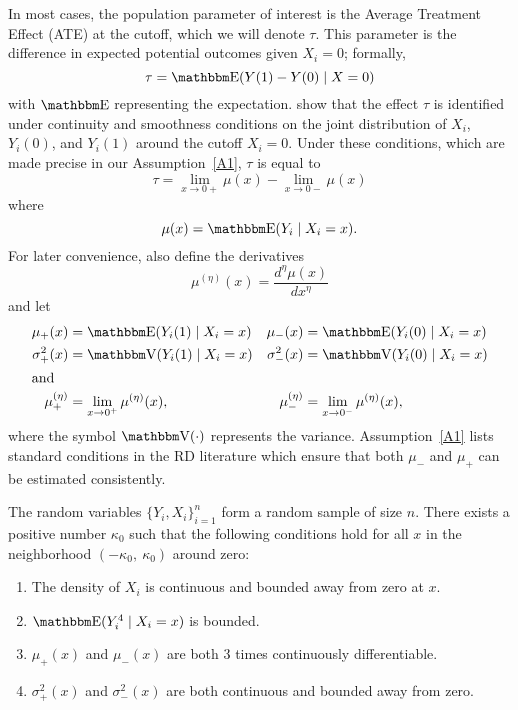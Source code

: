 \documentclass[12pt,fleqn]{article}
\begin{document}
In most cases, the population parameter of interest is the Average Treatment
Effect (ATE) at the cutoff, which we will denote $\tau$. This parameter is the
difference in expected potential outcomes given $X_i = 0$; formally,
\begin{equation*}
  \tau=\E(Y(1)-Y(0) \mid X=0)
\end{equation*}
with $\E$ representing the expectation.
\cite{HTV2001} show that the effect $\tau$ is identified under continuity and
smoothness conditions on the joint distribution of $X_i$, $Y_i(0)$, and $Y_i(1)$
around the cutoff $X_i = 0$. Under these conditions, which are made precise
in our Assumption~\ref{A1}, $\tau$ is equal to
\begin{equation*}
  \tau = \lim_{x \to 0+} \mu(x) - \lim_{x \to 0-} \mu(x)
\end{equation*}
where
\begin{equation*}
  \mu(x)= \E(Y_{i} \mid X_{i}=x).
\end{equation*}
For later convenience, also define the derivatives
\begin{equation*}
  \mu^{(\eta)}(x)=\frac{d^{\eta}\mu(x)}{dx^{\eta}}
\end{equation*}
and let
\begin{align*}
  \mu_{+}(x)
  &= \E( Y_{i}(1) \mid X_{i}=x )
  &\mu_{-}(x)
  &= \E( Y_{i}(0) \mid X_{i}=x ) \\
  \sigma^{2}_{+}(x) &= \V( Y_{i}(1) \mid X_{i}=x )
  &\sigma^{2}_{-}(x)&=\V( Y_{i}(0) \mid X_{i}=x ) \\
\intertext{and}
  \mu^{(\eta)}_{+}
  &= \lim_{x \rightarrow 0^{+}}\mu^{(\eta)}(x),
  &\mu^{(\eta)}_{-}
  &= \lim_{x \rightarrow 0^{-}}\mu^{(\eta)}(x),
\end{align*}
where the symbol $\V(\cdot)$ represents the variance. Assumption~\ref{A1} lists
standard conditions in the RD literature which ensure that both $\mu_-$ and
$\mu_+$ can be estimated consistently.

\begin{assumption}\label{A1}
  The random variables $\{Y_i, X_i\}_{i=1}^n$ form a random sample of size $n$.
  There exists a positive number $\kappa_0$ such that the following
  conditions hold for all $x$ in the neighborhood $(-\kappa_{0},\ \kappa_{0})$
  around zero:
  \begin{enumerate}
  \item The density of $X_i$ is continuous and bounded away from zero at $x$.
  \item $\E(Y_{i}^{4} \mid X_{i}=x)$ is bounded.
  \item $\mu_+(x)$ and $\mu_-(x)$ are both 3 times continuously differentiable.
  \item $\sigma_+^2(x)$ and $\sigma_-^2(x)$ are both continuous and bounded away
    from zero.
 \end{enumerate}
\end{assumption}
\end{document}
